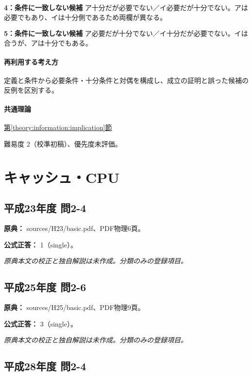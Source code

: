 \noindent\textbf{4：条件に一致しない候補} ア十分だが必要でない／イ必要だが十分でない。アは必要でもあり、イは十分側であるため両欄が異なる。\par

\noindent\textbf{5：条件に一致しない候補} ア必要だが十分でない／イ十分だが必要でない。イは合うが、アは十分でもある。\par

\paragraph{再利用する考え方} 定義と条件から必要条件・十分条件と対偶を構成し、成立の証明と誤った候補の反例を区別する。

\paragraph{共通理論} \hyperref[theory:information:implication]{第\ref*{theory:information:implication}節}

\par 難易度 2（校準初稿）、優先度未評価。

\section{キャッシュ・CPU}

\subsection{平成23年度 問2-4}
\label{q:h23-reg-basic-2-4}

\noindent\textbf{原典：} sources/H23/basic.pdf、PDF物理6頁。

\textbf{公式正答：} 1（single）。

\par\textit{原典本文の校正と独自解説は未作成。分類のみの登録項目。}

\subsection{平成25年度 問2-6}
\label{q:h25-reg-basic-2-6}

\noindent\textbf{原典：} sources/H25/basic.pdf、PDF物理9頁。

\textbf{公式正答：} 3（single）。

\par\textit{原典本文の校正と独自解説は未作成。分類のみの登録項目。}

\subsection{平成28年度 問2-4}
\label{q:h28-reg-basic-2-4}

